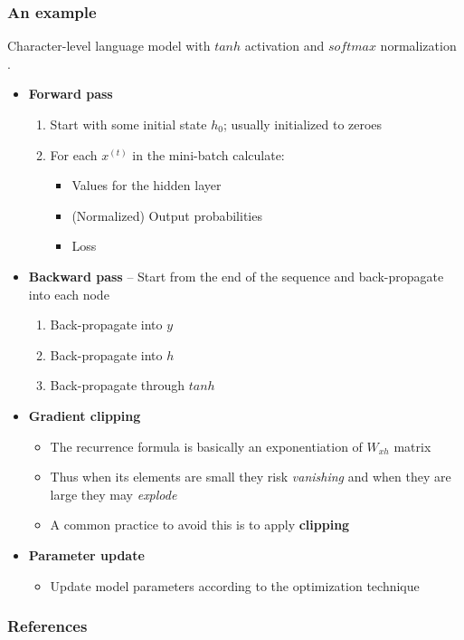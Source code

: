 \documentclass{beamer}
\begin{document}
\begin{frame}[allowframebreaks]
  \frametitle{An example}
  Character-level language model with \(tanh\) activation and \(softmax\) normalization \cite{rnn-gist} \cite{goodfellow-et-al-2016}.
  \begin{itemize}
    \item \textbf{Forward pass}
      \begin{enumerate}
        \item Start with some initial state \(h_0\); usually initialized to zeroes
        \item For each \(x^{(t)}\) in the mini-batch calculate:
          \begin{itemize}
            \item Values for the hidden layer
            \item (Normalized) Output probabilities
            \item Loss
          \end{itemize}
        \end{enumerate}
    \framebreak
  \item \textbf{Backward pass} -- Start from the end of the sequence and back-propagate into each node
    \begin{enumerate}
      \item Back-propagate into \(y\)
      \item Back-propagate into \(h\)
      \item Back-propagate through \(tanh\)
      \end{enumerate}
  \framebreak
  \item \textbf{Gradient clipping}
    \begin{itemize}
      \item The recurrence formula is basically an exponentiation of \(W_{xh}\) matrix
      \item Thus when its elements are small they risk \textit{vanishing} and when they are large they may \textit{explode}
      \item A common practice to avoid this is to apply \textbf{clipping}
    \end{itemize}
  \framebreak
  \item \textbf{Parameter update}
    \begin{itemize}
      \item Update model parameters according to the optimization technique
      \end{itemize}
  \end{itemize}
\end{frame}
\begin{frame}[allowframebreaks]
  \frametitle{References}
  
  
\end{frame}
\end{document}
